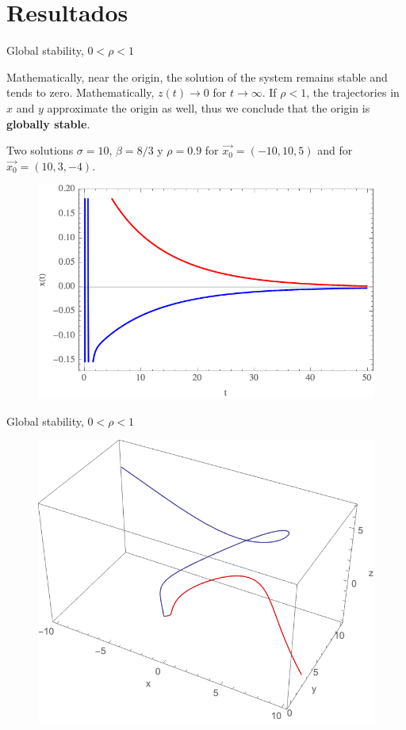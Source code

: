 \documentclass[hyperref={pdfpagelabels=false}]{beamer}
\begin{document}
\section{Resultados}

\begin{frame}{Global stability, $0<\rho<1$}

Mathematically, near the origin, the solution of the system remains stable and tends to zero. Mathematically,  $z(t)\rightarrow0$ for $t\rightarrow \infty$. If $\rho<1$, the trajectories in $x$ and $y$ approximate the origin as well, thus we conclude that the origin is \textbf{globally stable}.



\begin{block}{Two solutions}
$\sigma=10$, $\beta=8/3$ y $\rho=0.9$ for $\Vec{x_{0}}=(-10,10,5)$ and for $\Vec{x_{0}}=(10,3,-4)$.
\end{block}

\begin{figure}

\includegraphics[width=0.6\linewidth]{Figures/seriesdetiempo.png}

\end{figure}

    
\end{frame}

\begin{frame}{Global stability, $0<\rho<1$}

\begin{figure}

\includegraphics[width=0.75\linewidth]{Figures/atractores.png}

\end{figure}

\end{frame}
\end{document}
